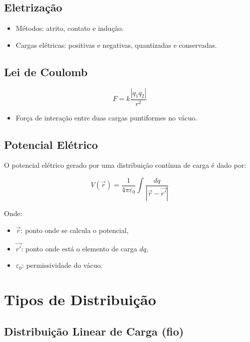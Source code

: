 \documentclass[a4paper,12pt]{article}
\begin{document}
\begin{multicols}{2}
\subsection{Eletrização}
\begin{itemize}
    \item Métodos: atrito, contato e indução.
    \item Cargas elétricas: positivas e negativas, quantizadas e conservadas.
\end{itemize}

\subsection{Lei de Coulomb}
\begin{equation}
    F = k \frac{|q_1 q_2|}{r^2}
\end{equation}
\begin{itemize}
    \item Força de interação entre duas cargas puntiformes no vácuo.
\end{itemize}

\subsection{Potencial Elétrico}
O potencial elétrico gerado por uma distribuição contínua de carga é dado por:

\begin{equation}
V(\vec{r}) = \frac{1}{4\pi \varepsilon_0} \int \frac{dq}{|\vec{r} - \vec{r'}|}
\end{equation}

Onde:
\begin{itemize}
  \item \( \vec{r} \): ponto onde se calcula o potencial,
  \item \( \vec{r'} \): ponto onde está o elemento de carga \( dq \),
  \item \( \varepsilon_0 \): permissividade do vácuo.
\end{itemize}

\section{Tipos de Distribuição}

\subsection{Distribuição Linear de Carga (fio)}


\end{multicols}
\end{document}
